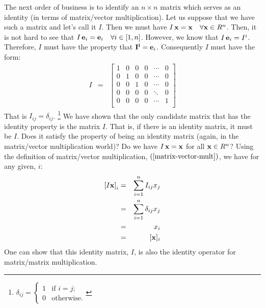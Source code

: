 \documentclass{article}
\begin{document}
The next order of business is to identify an $n \times n$ matrix which serves as an
identity (in terms of matrix/vector multiplication).
Let us suppose that we have such a matrix and let's call it $I$.
Then we must have $I \, {\bf x} = {\bf x} \quad \forall {\bf x} \in R^n$. 
Then, it is not hard
to see that $I \, {\bf e}_{i} = {\bf e}_i \quad \forall i \in [1, n]$. 
However, we know that $I \, {\bf e}_i = I^i$. Therefore, $I$
must have the property that ${\bf I^i} = {\bf e}_i$. Consequently $I$ must have the form:
\begin{eqnarray}
  I & = & \left[
      \begin{array}{cccccc}
        1 & 0 & 0 & 0 & \cdots & 0 \\
        0 & 1 & 0 & 0 & \cdots & 0 \\
        0 & 0 & 1 & 0 & \cdots & 0 \\
        0 & 0 & 0 & 0 & \ddots & 0 \\
        0 & 0 & 0 & 0 & \cdots & 1 \\
      \end{array}
  \right]
\end{eqnarray}
That is $I_{ij} = \delta_{ij}$.%
\footnote{$\delta_{ij} = \left\{\begin{array}{ll}
                                 1 & \text{if $i = j$;} \\
                                 0 & \text{otherwise.}
                               \end{array} \right.$}
We have shown that the only candidate matrix that has the identity property is the
matrix $I$. That is, if there is an identity matrix, it must be $I$. Does it satisfy
the property of being an identity matrix (again, in the matrix/vector multiplication world)?
Do we have $I \, {\bf x} = {\bf x}$ for all ${\bf x} \in R^n$?
Using the definition of matrix/vector multiplication, $(\ref{matrix-vector-mult})$, we
have for any given, $i$:
\begin{eqnarray}
  \left[I {\bf x}\right]_i & = & \sum_{i=1}^n I_{ij} x_j \nonumber \\
                           & = & \sum_{i=1}^n \delta_{ij} x_j \nonumber \\
                           & = & x_i \nonumber \\
                           & = & [{\bf x}]_i
\end{eqnarray}
One can show that this identity matrix, $I$, is also the identity operator for
matrix/matrix multiplication.
\end{document}
